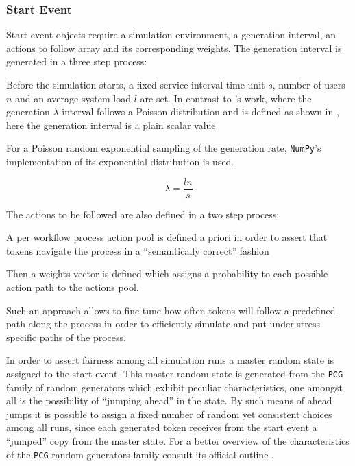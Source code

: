 \documentclass[draft=false]{seal_thesis}
\begin{document}
\subsubsection{Start Event}

Start event objects require a simulation environment, a generation interval, an actions to follow array and its corresponding weights. The generation interval is generated in a three step process:
\begin{enumerate*}
 	\item Before the simulation starts, a fixed service interval time unit $s$, number of users $n$ and an average system load $l$ are set. In contrast to \citet{Zeng2005}'s work, where the generation $\lambda$ interval follows a Poisson distribution and is defined as shown in , here the generation interval is a plain scalar value
 	\item For a Poisson random exponential sampling of the generation rate, \texttt{NumPy}'s implementation of its exponential distribution is used.
 \end{enumerate*}

\begin{equation}
\label{eq:generation_interval}
	\lambda = \frac{l n}{s}
\end{equation}

The actions to be followed are also defined in a two step process:
\begin{enumerate*}
	\item A per workflow process action pool is defined a priori in order to assert that tokens navigate the process in a ``semantically correct'' fashion
	\item Then a weights vector is defined which assigns a probability to each possible action path to the actions pool.
\end{enumerate*}

Such an approach allows to fine tune how often tokens will follow a predefined path along the process in order to efficiently simulate and put under stress specific paths of the process.

In order to assert fairness among all simulation runs a master random state is assigned to the start event. This master random state is generated from the \texttt{PCG} family of random generators which exhibit peculiar characteristics, one amongst all is the possibility of ``jumping ahead'' in the state. By such means of ahead jumps it is possible to assign a fixed number of random yet consistent choices among all runs, since each generated token receives from the start event a ``jumped'' copy from the master state. For a better overview of the characteristics of the \texttt{PCG} random generators family consult its official outline .
\end{document}
